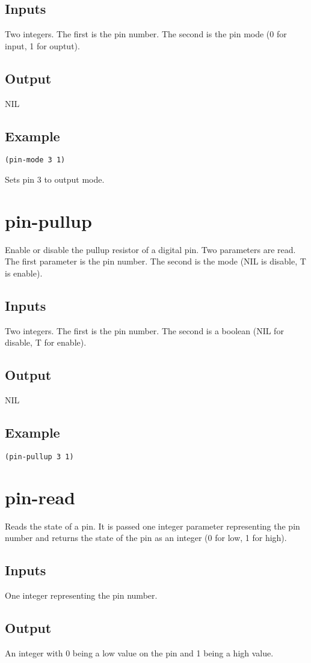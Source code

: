 \documentclass[10pt, openany]{book}
\begin{document}
\subsection{Inputs}
Two integers.  The first is the pin number.  The second is the pin mode (0 for input, 1 for ouptut).
\subsection{Output}
NIL
\subsection{Example}
\begin{lstlisting}
(pin-mode 3 1)
\end{lstlisting}
Sets pin 3 to output mode.

\section{pin-pullup}
Enable or disable the pullup resistor of a digital pin.  Two parameters are read.  The first parameter is the pin number.  The  second is the mode (NIL is disable, T is enable).
\subsection{Inputs}
Two integers.  The first is the pin number.  The second is a boolean (NIL for disable, T for enable).
\subsection{Output}
NIL
\subsection{Example}
\begin{lstlisting}
(pin-pullup 3 1)
\end{lstlisting}

\section{pin-read}
Reads the state of a pin.  It is passed one integer parameter representing the pin number and returns the state of the pin as an integer (0 for low, 1 for high).
\subsection{Inputs}
One integer representing the pin number.
\subsection{Output}
An integer with 0 being a low value on the pin and 1 being a high value.
\end{document}
